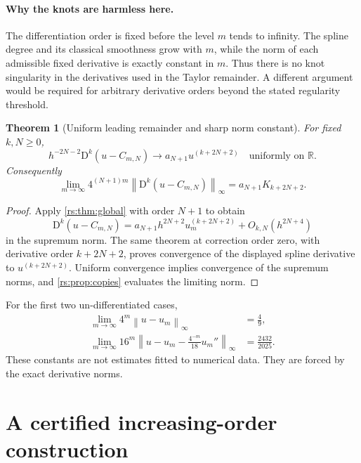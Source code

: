 \documentclass[11pt,a4paper,oneside,openany]{book}
\numberwithin{equation}{chapter}
\newtheorem{theorem}{Theorem}[chapter]
\theoremstyle{definition}
\theoremstyle{remark}
\newcommand{\R}{\mathbb R}
\newcommand{\norm}[1]{\left\lVert #1\right\rVert}
\newcommand{\D}{\mathrm D}
\begin{document}
\paragraph{Why the knots are harmless here.}
The differentiation order is fixed before the level $m$ tends to
infinity. The spline degree and its classical smoothness grow with
$m$, while the norm of each admissible fixed derivative is exactly
constant in $m$. Thus there is no knot singularity in the derivatives
used in the Taylor remainder. A different argument would be required
for arbitrary derivative orders beyond the stated regularity threshold.

\begin{theorem}[Uniform leading remainder and sharp norm constant]\label{rs:thm:sharp}
For fixed $k,N\geq0$,
\begin{equation}
 h^{-2N-2}\D^k(u-C_{m,N})
 \longrightarrow a_{N+1}u^{(k+2N+2)}
 \quad\text{uniformly on }\R.
 \label{rs:eq:leading-remainder}
\end{equation}
Consequently
\begin{equation}
 \lim_{m\to\infty}4^{(N+1)m}
       \norm{\D^k(u-C_{m,N})}_\infty
       =a_{N+1}K_{k+2N+2}.
 \label{rs:eq:sharp-limit}
\end{equation}
\end{theorem}
\begin{proof}
Apply \cref{rs:thm:global} with order $N+1$ to obtain
\begin{equation}
 \D^k(u-C_{m,N})
 =a_{N+1}h^{2N+2}u_m^{(k+2N+2)}+O_{k,N}(h^{2N+4})
\end{equation}
in the supremum norm. The same theorem at correction order zero,
with derivative order $k+2N+2$, proves convergence of the displayed
spline derivative to $u^{(k+2N+2)}$. Uniform convergence implies
convergence of the supremum norms, and \cref{rs:prop:copies} evaluates
the limiting norm.
\end{proof}

For the first two un-differentiated cases,
\begin{align}
 \lim_{m\to\infty}4^m\norm{u-u_m}_\infty&=\frac49,\label{rs:eq:sharp-first}\\
 \lim_{m\to\infty}16^m
 \left\|u-u_m-\frac{4^{-m}}{18}u_m''\right\|_\infty
 &=\frac{2432}{2025}.
 \label{rs:eq:sharp-second}
\end{align}
These constants are not estimates fitted to numerical data.
They are forced by the exact derivative norms.

\section{A certified increasing-order construction}
\end{document}
